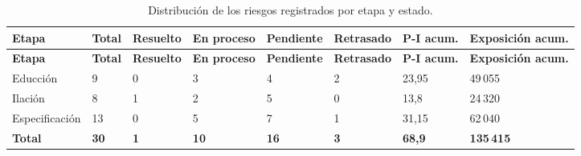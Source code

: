 {\footnotesize\setlength{\tabcolsep}{3pt}
\begin{longtable}{L{2.0cm} R{1.0cm} R{1.5cm} R{1.4cm} R{1.65cm} R{1.7cm} R{1.8cm} R{2.2cm}}
\caption{Distribución de los riesgos registrados por etapa y estado.}
\label{tab:riesgos-resumen}\\
\toprule
\textbf{Etapa} & \textbf{Total} & \textbf{Resuelto} & \textbf{En proceso} & \textbf{Pendiente} & \textbf{Retrasado} & \textbf{P-I acum.} & \textbf{Exposición acum.} \\
\midrule
\endfirsthead
\toprule
\textbf{Etapa} & \textbf{Total} & \textbf{Resuelto} & \textbf{En proceso} & \textbf{Pendiente} & \textbf{Retrasado} & \textbf{P-I acum.} & \textbf{Exposición acum.} \\
\midrule
\endhead
\bottomrule
\endfoot
Educción & 9 & 0 & 3 & 4 & 2 & 23,95 & 49\,055 \\
Ilación & 8 & 1 & 2 & 5 & 0 & 13,8 & 24\,320 \\
Especificación & 13 & 0 & 5 & 7 & 1 & 31,15 & 62\,040 \\
\midrule
\textbf{Total} & \textbf{30} & \textbf{1} & \textbf{10} & \textbf{16} & \textbf{3} & \textbf{68,9} & \textbf{135\,415} \\
\end{longtable}
}
